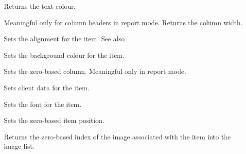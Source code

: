 
Returns the text colour.

\label{wxlistitemgetwidth}


Meaningful only for column headers in report mode. Returns the column width.

\label{wxlistitemsetalign}


Sets the alignment for the item. See also

\label{wxlistitemsetbackgroundcolour}


Sets the background colour for the item.

\label{wxlistitemsetcolumn}


Sets the zero-based column. Meaningful only in report mode.

\label{wxlistitemsetdata}



Sets client data for the item.

\label{wxlistitemsetfont}


Sets the font for the item.

\label{wxlistitemsetid}


Sets the zero-based item position.

\label{wxlistitemsetimage}


Returns the zero-based index of the image associated with the item
into the image list.

\label{wxlistitemsetmask}

